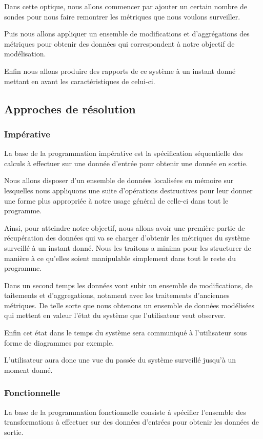 \documentclass{article}
\begin{document}
Dans cette optique, nous allons commencer par ajouter un certain nombre de
sondes pour nous faire remontrer les métriques que nous voulons surveiller.

Puis nous allons appliquer un ensemble de modifications et d'aggrégations des
métriques pour obtenir des données qui correspondent à notre objectif de modélisation.

Enfin nous allons produire des rapports de ce système à un instant donné mettant
en avant les caractéristiques de celui-ci.

\subsection{Approches de résolution}
\subsubsection{Impérative}
La base de la programmation impérative est la spécification séquentielle
des calculs à effectuer sur une donnée d'entrée pour obtenir une donnée en sortie.

Nous allons disposer d'un ensemble de données localisées en mémoire sur lesquelles
nous appliquons une suite d'opérations destructives pour leur donner une forme
plus appropriée à notre usage général de celle-ci dans tout le programme.

Ainsi, pour atteindre notre objectif, nous allons avoir une première partie de
récupération des données qui va se charger d'obtenir les métriques du système
surveillé à un instant donné.
Nous les traitons a minima pour les structurer de manière à ce qu'elles soient
manipulable simplement dans tout le reste du programme.

Dans un second temps les données vont subir un ensemble de modifications, de
taitements et d'aggregations, notament avec les traitements d'anciennes métriques.
De telle sorte que nous obtenons un ensemble de données modélisées qui mettent en
valeur l'état du système que l'utilisateur veut observer.

Enfin cet état dans le temps du système sera communiqué à l'utilisateur sous forme
de diagrammes par exemple.

L'utilisateur aura donc une vue du passée du système surveillé jusqu'à un moment donné.

\subsubsection{Fonctionnelle}
La base de la programmation fonctionnelle consiste à spécifier l'ensemble des
transformations à effectuer sur des données d'entrées pour obtenir les données de sortie.
\end{document}
